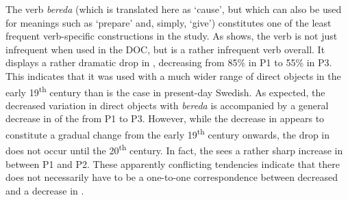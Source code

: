 \documentclass[output=paper]{langscibook}
\begin{document}
The verb \textit{bereda} (which is translated here as ‘cause’, but which can also be used for meanings such as ‘prepare’ and, simply, ‘give’) constitutes one of the least frequent verb-specific constructions in the study. As  shows, the verb is not just infrequent when used in the DOC, but is a rather infrequent verb overall. It displays a rather dramatic drop in , decreasing from 85\% in P1 to 55\% in P3. This indicates that it was used with a much wider range of direct objects in the early 19\textsuperscript{th} century than is the case in present-day Swedish. As expected, the decreased variation in direct objects with \textit{bereda} is accompanied by a general decrease in  of the  from P1 to P3. However, while the decrease in  appears to constitute a gradual change from the early 19\textsuperscript{th} century onwards, the drop in  does not occur until the 20\textsuperscript{th} century. In fact, the  sees a rather sharp increase in  between P1 and P2. These apparently conflicting tendencies indicate that there does not necessarily have to be a one-to-one correspondence between decreased  and a decrease in .


\begin{table}
\caption{Frequency measures of the verb-specific DOC with \textit{bereda} ‘cause’\label{tab:valdeson:8}}
\end{table}
\end{document}

